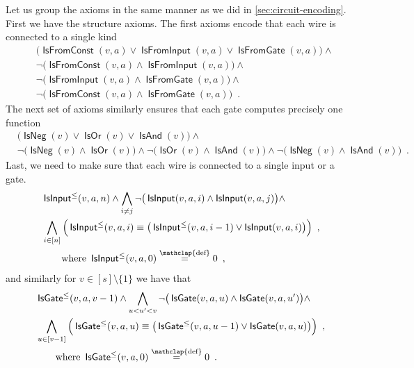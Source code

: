 \documentclass[10pt,a4paper]{article}
\theoremstyle{plain}
\theoremstyle{remark}
\theoremstyle{definition}
\newcommand\defeq{\stackrel{\mathclap{\normalfont\mbox{\scriptsize{def}}}}{=}}
\newcommand{\eqcomma}{\enspace ,}
\newcommand{\eqperiod}{\enspace .}
\newcommand{\vars}[1]{\mathsf{#1}}
\DeclareMathOperator{\isneg}{\vars{IsNeg}}
\DeclareMathOperator{\isand}{\vars{IsAnd}}
\DeclareMathOperator{\isor}{\vars{IsOr}}
\DeclareMathOperator{\isfromconst}{\vars{IsFromConst}}
\DeclareMathOperator{\isfromvar}{\vars{IsFromInput}}
\DeclareMathOperator{\isfromgate}{\vars{IsFromGate}}
\DeclareMathOperator{\isvar}{\vars{IsInput}}
\DeclareMathOperator{\isgate}{\vars{IsGate}}
\DeclareMathOperator{\isvarless}{\vars{IsInput^{\le}}}
\DeclareMathOperator{\isgateless}{\vars{IsGate^{\le}}}
\begin{document}
Let us group the axioms in the same manner as we did in
\cref{sec:circuit-encoding}. First we have the structure axioms. The
first axioms encode that each wire is connected to a single kind
\begin{align}
  &\big(\isfromconst(v, a) \vee \isfromvar(v, a) \vee \isfromgate(v,
    a)\big) \wedge \nonumber\\
  &\neg\big(\isfromconst(v, a) \wedge \isfromvar(v, a)\big) \wedge\nonumber\\
  &\neg\big(\isfromvar(v, a) \wedge \isfromgate(v, a)\big) \wedge\nonumber\\
  &\neg\big(\isfromconst(v, a) \wedge \isfromgate(v, a)\big) \eqperiod
\end{align}
The next set of axioms similarly ensures that each gate computes
precisely one function
\begin{align}
  &\big(\isneg(v) \vee \isor(v) \vee \isand(v)\big) \land\nonumber\\
  &\neg\big(\isneg(v) \wedge \isor(v)\big) \wedge \neg\big(\isor(v) \wedge
    \isand(v)\big) \wedge \neg\big(\isneg(v) \wedge \isand(v)\big) \eqperiod
\end{align}
Last, we need to make sure that each wire is connected to a single
input or a gate.
\begin{align}
  \label{ax:input-cnf}
  &\isvarless(v, a, n) \wedge \bigwedge_{i \neq j}\neg \big(\isvar(v,a,i) \wedge
    \isvar(v,a,j)\big) \wedge\nonumber\\
    &\bigwedge_{i \in [n]}
      \Big(\isvarless(v, a, i) \equiv
    \big(\isvarless(v, a, i-1) \vee \isvar(v, a, i)\big)
    \Big) \eqcomma \nonumber\\
  &\qquad\text{where } \isvarless(v, a, 0) \defeq 0 \eqcomma
\end{align}
and similarly for $v \in [s] \setminus \{1\}$ we have that 
\begin{align}
  \label{ax:gate-cnf}
  &\isgateless(v, a, v-1) \wedge
    \bigwedge_{u < u' < v} \neg\big(\isgate(v,a,u) \wedge \isgate(v,a,u')\big)
    \wedge\nonumber\\
  &\bigwedge_{u \in [v-1]}
    \Big(
    \isgateless(v, a, u) \equiv
    \big(\isgateless(v, a, u-1) \vee \isgate(v, a, u)\big)
    \Big)\eqcomma \nonumber\\
  &\qquad\text{where }\isgateless(v, a, 0) \defeq 0 \eqperiod
\end{align}
\end{document}
